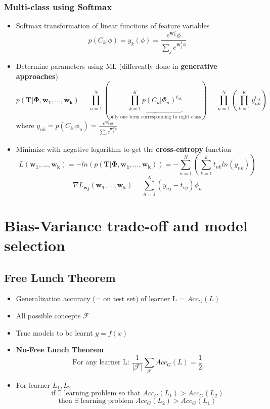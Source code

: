 \documentclass[12pt]{article} %
\begin{document}
\subsubsection{Multi-class using Softmax}
\begin{itemize}
\item Softmax transformation of linear functions of feature variables
$$ p(C_k|\phi) = y_k(\phi)= \frac{e^{\bm{w}^T_{k}}\phi}{\sum \limits_j e^{\bm{w}^T_j \phi}}$$
\item Determine parameters using ML (differently done in \textbf{generative approaches})
$$ p(\bm{T} |\bm{\Phi ,w_1,...,w_k}) = \prod \limits_{n=1}^N \left(\underbrace{ \prod \limits_{k=1}^K p(C_k |\Phi_n)^{t_{nk}}}_{\text{only one term corresponding to right class}} \right) = \prod\limits_{n=1}^{N} \left( \prod \limits_{k=1}^K  y_{nk}^{t_{nk}}\right)$$
where $y_{nk} = p(C_k|\phi_n)= \frac{e^{\bm{w}^T_{k}}\phi}{\sum \limits_j e^{\bm{w}^T_j \phi}}$

\item Minimize with negative logarithm to get the \textbf{cross-entropy} function
$$ L(\bm{w_1,...,w_k}) = - ln(p(\bm{T}| \bm{\Phi,w_1,...,w_k}))= -\sum
\limits_{n=1}^N \left( \sum \limits_{k=1}^k t_{nk}ln(y_{nk})\right)$$
$$ \nabla L_{\bm{w_j}} (\bm{w_1,...,w_k})= \sum \limits_{n=1} ^{N} (y_{nj} - t_{nj})\phi_n$$
\end{itemize}



\section{Bias-Variance trade-off and model selection}
\subsection{Free Lunch Theorem}
\begin{itemize}
\item Generalization accuracy (= on test set) of learner L =
$ Acc_G(L)$
\item All possible concepts $\mathcal{F}$
\item True models to be learnt $y=f(x)$
\item \textbf{No-Free Lunch Theorem}
$$ \text{For any learner L: } \frac{1}{|\mathcal{F}|} \sum \limits_{\mathcal{F}}Acc_G(L) = \frac{1}{2}$$
\item For learner $L_1, L_2$ 
$$ \text{if } \exists \text{ learning problem so that } Acc_G(L_1)>Acc_G(L_2) $$
$$ \text{then }\exists \text{ learning problem } Acc_G(L_2)>Acc_G(L_1)$$
\end{itemize}
\end{document}
